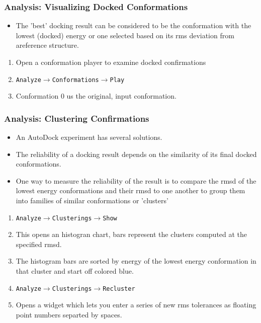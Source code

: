 \documentclass[slidestop,mathserif,compress,xcolor=svgnames]{beamer}
\newenvironment{eblock}[0]
{
\begin{beamerboxesrounded}[upper=uppercol2,lower=lowercol2,shadow=true]}
{\end{beamerboxesrounded}}
\begin{document}
\begin{frame}[allowframebreaks]
  \frametitle{\small Analysis: Visualizing Docked Conformations}
  \begin{itemize}
    \item The 'best' docking result can be considered to be the conformation with the lowest (docked) energy or one selected based on its rms deviation from areference structure.
  \end{itemize}

  \begin{eblock}{}
    \begin{enumerate}
      \item Open a conformation player to examine docked confirmations
      \item[] \texttt{Analyze$\rightarrow$Conformations$\rightarrow$Play}
      \item[] Conformation 0 us the original, input conformation.
    \end{enumerate}
  \end{eblock}
\end{frame}

\begin{frame}[allowframebreaks]
  \frametitle{\small Analysis: Clustering Confirmations}
  \begin{itemize}
    \item An AutoDock experiment has several solutions.
    \item The reliability of a docking result depends on the similarity of its final docked conformations.
    \item One way to measure the reliability of the result is to compare the rmsd of the lowest energy conformations and their rmsd to one another to group them into families of similar conformations or 'clusters'
  \end{itemize}

  \begin{eblock}{}
    \begin{enumerate}
      \item \texttt{Analyze$\rightarrow$Clusterings$\rightarrow$Show}
      \item[] This opens an histogran chart, bars represent the clusters computed at the specified rmsd. 
      \item[] The histogram bars are sorted by energy of the lowest energy conformation in that cluster and start off colored blue.
      \item \texttt{Analyze$\rightarrow$Clusterings$\rightarrow$Recluster}
      \item[] Opens a widget which lets you enter a series of new rms tolerances as floating point numbers separted by spaces.
    \end{enumerate}
  \end{eblock}
\end{frame}
\end{document}
